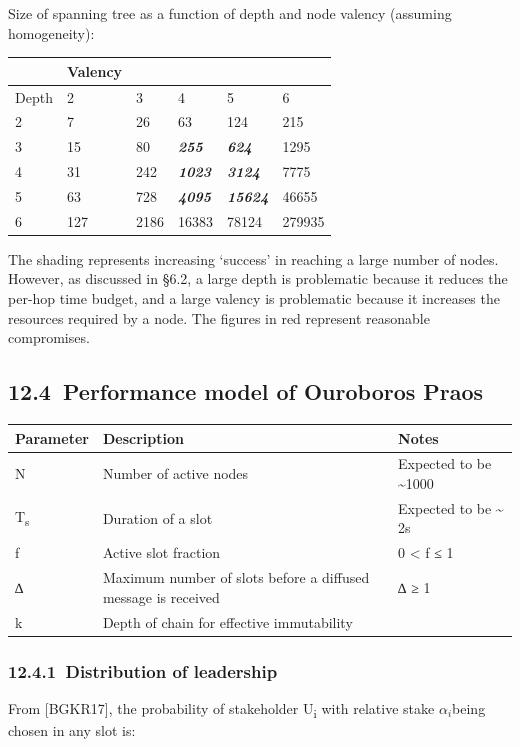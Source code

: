 \documentclass[]{article}
\begin{document}
Size of spanning tree as a function of depth and node valency (assuming
homogeneity):

\begin{longtable}[]{@{}llllll@{}}
\toprule
& Valency & & & &\tabularnewline
\midrule
\endhead
Depth & 2 & 3 & 4 & 5 & 6\tabularnewline
2 & 7 & 26 & 63 & 124 & 215\tabularnewline
3 & 15 & 80 & \emph{\textbf{255}} & \emph{\textbf{624}} &
1295\tabularnewline
4 & 31 & 242 & \emph{\textbf{1023}} & \emph{\textbf{3124}} &
7775\tabularnewline
5 & 63 & 728 & \emph{\textbf{4095}} & \emph{\textbf{15624}} &
46655\tabularnewline
6 & 127 & 2186 & 16383 & 78124 & 279935\tabularnewline
\bottomrule
\end{longtable}

The shading represents increasing `success' in reaching a large number
of nodes. However, as discussed in §6.2, a large depth is problematic
because it reduces the per-hop time budget, and a large valency is
problematic because it increases the resources required by a node. The
figures in red represent reasonable compromises.

\hypertarget{performance-model-of-ouroboros-praos}{%
\subsection{​12.4​~Performance model of Ouroboros
Praos}\label{performance-model-of-ouroboros-praos}}

\begin{longtable}[]{@{}lll@{}}
\toprule
\textbf{Parameter} & \textbf{Description} &
\textbf{Notes}\tabularnewline
\midrule
\endhead
N & Number of active nodes & Expected to be
\textasciitilde{}1000\tabularnewline
T\textsubscript{s} & Duration of a slot & Expected to be
\textasciitilde{} 2s\tabularnewline
f & Active slot fraction & 0 \textless{} f ≤ 1\tabularnewline
∆ & Maximum number of slots before a diffused message is received & ∆ ≥
1\tabularnewline
k & Depth of chain for effective immutability &\tabularnewline
\bottomrule
\end{longtable}

\hypertarget{distribution-of-leadership}{%
\subsubsection{​12.4.1​~Distribution of
leadership}\label{distribution-of-leadership}}

From {[}BGKR17{]}, the probability of stakeholder U\textsubscript{i}
with relative stake \(\alpha_{i}\)being chosen in any slot is:
\end{document}

